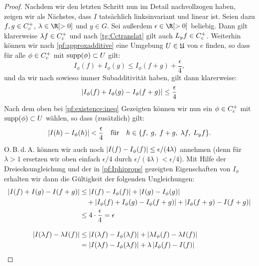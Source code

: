 \begin{proof}
    Nachdem wir den letzten Schritt nun im Detail nachvollzogen haben, zeigen
    wir als Nächstes, dass $I$ tatsächlich linksinvariant und linear ist. Seien
    dazu $f,g\in C_c^+$, $\lambda\in\R[>0]$ und $y\in G$. Sei außerdem
    $\epsilon\in\R[>0]$ beliebig. Dann gilt klarerweise $\lambda f
    \in C_c^+$ und nach \cref{tg:Cctranslat} gilt auch $L_yf
    \in C_c^+$. Weiterhin können wir nach \cref{pf:approxadditive} eine
    Umgebung $U\in\mathfrak{U}$ von $e$ finden, so dass für alle
    $\phi\in C_c^+$ mit $\operatorname{supp}(\phi)\subset U$ gilt:
    \[ I_\phi(f) + I_\phi(g) \leq I_\phi(f+g) + \frac{\epsilon}{4} , \]
    und da wir nach  sowieso immer
    Subadditivität haben, gilt dann klarerweise:
    \[ \lvert I_\phi(f) + I_\phi(g) - I_\phi(f+g) \rvert \leq \frac{\epsilon}{4}
    \]
    Nach dem oben bei \eqref{pf:existence:ineq} Gezeigten können wir nun ein
    $\phi\in C_c^+$ mit $\operatorname{supp}(\phi)\subset U$ wählen, so dass
    (zusätzlich) gilt:
    \[
        \lvert I(h) - I_\phi(h) \rvert < \frac{\epsilon}{4}
        \quad\text{für}\quad
        h \in \{ f,\; g,\; f+g,\; \lambda f,\; L_yf \}
    . \]
    O.\,B.\,d.\,A. können wir auch noch 
    $\lvert I(f) - I_\phi(f) \rvert \leq \epsilon/(4\lambda)$
    annehmen (denn für $\lambda > 1$ ersetzen wir oben einfach $\epsilon/4$
    durch $\epsilon/(4\lambda) < \epsilon/4$).
    Mit Hilfe der Dreiecksungleichung und der in \cref{pf:Iphiprops} gezeigten
    Eigenschaften von $I_\phi$ erhalten wir dann die Gültigkeit der folgenden
    Ungleichungen:
    { \allowdisplaybreaks
    \begin{align*}
        \abs{ I(f) + I(g) - I(f+g) }                                        %
        &\leq \abs{ I(f) - I_\phi(f) } + \abs{ I(g) - I_\phi(g) }           \\
        &\quad+ \abs{ I_\phi(f) + I_\phi(g) - I_\phi(f+g) }                 %
            + \abs{ I_\phi(f+g) - I(f+g) }                                  \\
        &\leq 4\cdot\frac{\epsilon}{4} = \epsilon                           %
        \\[2ex]
        \abs{ I(\lambda f) - \lambda I(f) }                                 %
        &\leq \abs{ I(\lambda f) - I_\phi(\lambda f) }                      %
            + \abs{ \lambda I_\phi(f) - \lambda I(f) }                      \\
        &=    \abs{ I(\lambda f) - I_\phi(\lambda f) }                      %
            + \lambda \, \abs{ I_\phi(f) - I(f) }                           \\

\end{align*}}
\end{proof}

